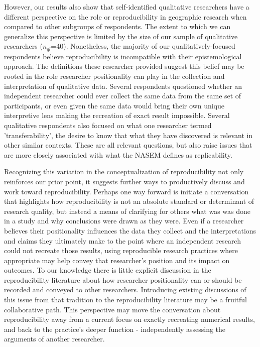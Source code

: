 \documentclass[]{interact}
\theoremstyle{plain}%
\theoremstyle{definition}
\theoremstyle{remark}
\begin{document}
However, our results also show that self-identified qualitative researchers have a different perspective on the role or reproducibility in geographic research when compared to other subgroups of respondents.
The extent to which we can generalize this perspective is limited by the size of our sample of qualitative researchers (\textit{$n_{ql}$}=40).  
Nonetheless, the majority of our qualitatively-focused respondents believe reproducibility is incompatible with their epistemological approach.  
The definitions these researcher provided suggest this belief may be rooted in the role researcher positionality can play in the collection and interpretation of qualitative data. 
Several respondents questioned whether an independent researcher could ever collect the same data from the same set of participants, or even given the same data would bring their own unique interpretive lens making the recreation of exact result impossible.  
Several qualitative respondents also focused on what one researcher termed 'transferability', the desire to know that what they have discovered is relevant in other similar contexts. 
These are all relevant questions, but also raise issues that are more closely associated with what the NASEM defines as replicability. 

Recognizing this variation in the conceptualization of reproducibility not only reinforces our prior point, it suggests further ways to productively discuss and work toward reproducibility. 
Perhaps one way forward is initiate a conversation that highlights how reproducibility is not an absolute standard or determinant of research quality, but instead a means of clarifying for others what was was done in a study and why conclusions were drawn as they were.
Even if a researcher believes their positionality influences the data they collect and the interpretations and claims they ultimately make to the point where an independent research could not recreate those results, using reproducible research practices where appropriate may help convey that researcher's position and its impact on outcomes.
To our knowledge there is little explicit discussion in the reproducibility literature about how researcher positionality can or should be recorded and conveyed to other researchers. 
Introducing existing discussions of this issue from that tradition to the reproducibility literature may be a fruitful collaborative path.  
This perspective may move the conversation about reproducibility away from a current focus on exactly recreating numerical results, and back to the practice's deeper function - independently assessing the arguments of another researcher. 
\end{document}

